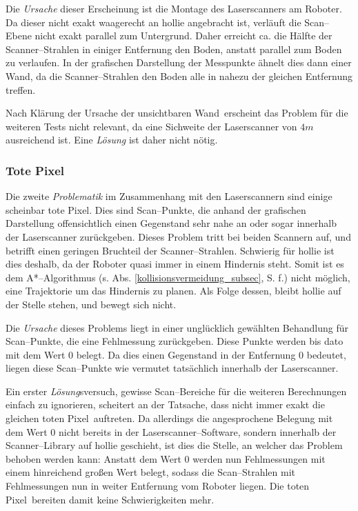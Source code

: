 Die \emph{Ursache} dieser Erscheinung ist die Montage des Laserscanners am Roboter.
Da dieser nicht exakt waagerecht an \gls{hollie} angebracht ist, verläuft die Scan--Ebene nicht exakt parallel zum Untergrund.
Daher erreicht ca. die Hälfte der Scanner--Strahlen in einiger Entfernung den Boden, anstatt parallel zum Boden zu verlaufen.
In der grafischen Darstellung der Messpunkte ähnelt dies dann einer Wand, da die Scanner--Strahlen den Boden alle in nahezu der gleichen Entfernung treffen.

Nach Klärung der Ursache der \glqq unsichtbaren Wand\grqq\ erscheint das Problem für die weiteren Tests nicht relevant, da eine Sichweite der Laserscanner von $4m$ ausreichend ist.
Eine \emph{Lösung} ist daher nicht nötig.


\subsubsection{\glqq Tote Pixel\grqq}

Die zweite \emph{Problematik} im Zusammenhang mit den Laserscannern sind einige scheinbar \glqq tote Pixel\grqq.
Dies sind Scan--Punkte, die anhand der grafischen Darstellung offensichtlich einen Gegenstand sehr nahe an oder sogar innerhalb der Laserscanner zurückgeben.
Dieses Problem tritt bei beiden Scannern auf, und betrifft einen geringen Bruchteil der Scanner--Strahlen.
Schwierig für \gls{hollie} ist dies deshalb, da der Roboter quasi immer in einem Hindernis steht.
Somit ist es dem A*--Algorithmus (s. Abs. \ref{kollisionsvermeidung_subsec}, S. \pageref{kollisionsvermeidung_subsec} f.) nicht möglich, eine Trajektorie um das Hindernis zu planen.
Als Folge dessen, bleibt \gls{hollie} auf der Stelle stehen, und bewegt sich nicht.

Die \emph{Ursache} dieses Problems liegt in einer unglücklich gewählten Behandlung für Scan--Punkte, die eine Fehlmessung zurückgeben.
Diese Punkte werden bis dato mit dem Wert 0 belegt.
Da dies einen Gegenstand in der Entfernung 0 bedeutet, liegen diese Scan--Punkte wie vermutet tatsächlich innerhalb der Laserscanner.

Ein erster \emph{Lösung}sversuch, gewisse Scan--Bereiche für die weiteren Berechnungen einfach zu ignorieren, scheitert an der Tatsache, dass nicht immer exakt die gleichen \glqq toten Pixel\grqq\ auftreten.
Da allerdings die angesprochene Belegung mit dem Wert 0 nicht bereits in der Laserscanner--Software, sondern innerhalb der Scanner--Library auf \gls{hollie} geschieht, ist dies die Stelle, an welcher das Problem behoben werden kann:
Anstatt dem Wert 0 werden nun Fehlmessungen mit einem hinreichend großen Wert belegt, sodass die Scan--Strahlen mit Fehlmessungen nun in weiter Entfernung vom Roboter liegen.
Die \glqq toten Pixel\grqq\ bereiten damit keine Schwierigkeiten mehr.


